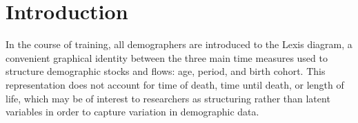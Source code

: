 \documentclass{bmcart}
\theoremstyle{definition}
\begin{document}
\begin{frontmatter}
\begin{abstractbox}

\begin{keyword}
\end{keyword}


\end{abstractbox}
%

\end{frontmatter}




\section{Introduction}
In the course of training, all demographers are introduced
to the Lexis diagram, a convenient graphical identity between the three main
time measures used to structure demographic stocks and flows: age, period, and
birth cohort. This representation does not account for time of death, time until
death, or length of life, which may be of interest to researchers as structuring rather than latent variables in order to capture
variation in demographic data. 
\end{document}
